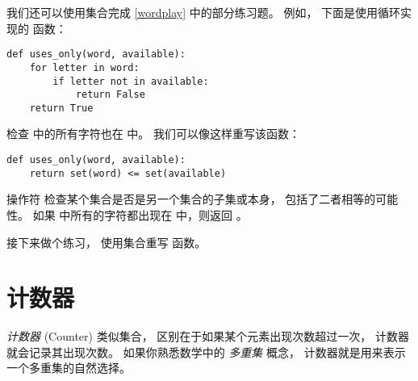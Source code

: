 我们还可以使用集合完成 \ref{wordplay} 中的部分练习题。
例如， 下面是使用循环实现的  函数：

\begin{lstlisting}
def uses_only(word, available):
    for letter in word:
        if letter not in available:
            return False
    return True
\end{lstlisting}


 检查  中的所有字符也在  中。
我们可以像这样重写该函数：

\begin{lstlisting}
def uses_only(word, available):
    return set(word) <= set(available)
\end{lstlisting}


操作符 \li{<=} 检查某个集合是否是另一个集合的子集或本身， 包括了二者相等的可能性。
如果  中所有的字符都出现在  中，则返回  。


接下来做个练习， 使用集合重写  函数。

\section{计数器}


{\em 计数器} (Counter) 类似集合， 区别在于如果某个元素出现次数超过一次， 计数器就会记录其出现次数。  如果你熟悉数学中的 {\em 多重集} 概念， 计数器就是用来表示一个多重集的自然选择。


